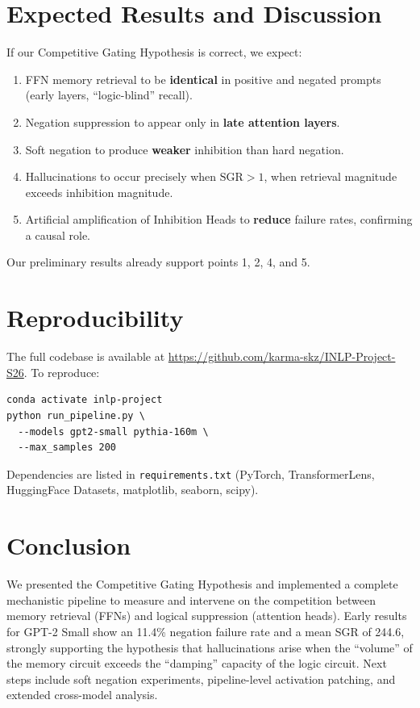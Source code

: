 \documentclass[11pt]{article}
\begin{document}
\section{Expected Results and Discussion}

If our Competitive Gating Hypothesis is correct, we expect:
\begin{enumerate}
\item FFN memory retrieval to be \textbf{identical} in positive and negated
      prompts (early layers, ``logic-blind'' recall).
\item Negation suppression to appear only in \textbf{late attention layers}.
\item Soft negation to produce \textbf{weaker} inhibition than hard negation.
\item Hallucinations to occur precisely when $\mathrm{SGR} > 1$, when
      retrieval magnitude exceeds inhibition magnitude.
\item Artificial amplification of Inhibition Heads to \textbf{reduce}
      failure rates, confirming a causal role.
\end{enumerate}
Our preliminary results already support points 1, 2, 4, and 5.

\section{Reproducibility}

The full codebase is available at
\url{https://github.com/karma-skz/INLP-Project-S26}.
To reproduce:
\begin{verbatim}
conda activate inlp-project
python run_pipeline.py \
  --models gpt2-small pythia-160m \
  --max_samples 200
\end{verbatim}
Dependencies are listed in \verb|requirements.txt| (PyTorch,
TransformerLens, HuggingFace Datasets, matplotlib, seaborn, scipy).

\section{Conclusion}

We presented the Competitive Gating Hypothesis and implemented a complete
mechanistic pipeline to measure and intervene on the competition between
memory retrieval (FFNs) and logical suppression (attention heads).
Early results for GPT-2 Small show an 11.4\% negation failure rate and a
mean SGR of 244.6, strongly supporting the hypothesis that hallucinations
arise when the ``volume'' of the memory circuit exceeds the ``damping''
capacity of the logic circuit.  Next steps include soft negation
experiments, pipeline-level activation patching, and extended cross-model
analysis.


\end{document}
